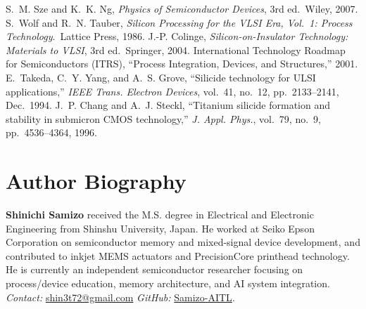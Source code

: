 \documentclass[conference]{IEEEtran}
\begin{document}
\begin{thebibliography}{99}
S.~M. Sze and K.~K. Ng, \emph{Physics of Semiconductor Devices}, 3rd ed.\ Wiley, 2007.
S.~Wolf and R.~N. Tauber, \emph{Silicon Processing for the VLSI Era, Vol.~1: Process Technology}.\ Lattice Press, 1986.
J.-P. Colinge, \emph{Silicon-on-Insulator Technology: Materials to VLSI}, 3rd ed.\ Springer, 2004.
International Technology Roadmap for Semiconductors (ITRS), ``Process Integration, Devices, and Structures,'' 2001.
E.~Takeda, C.~Y. Yang, and A.~S. Grove, ``Silicide technology for ULSI applications,'' \emph{IEEE Trans. Electron Devices}, vol.~41, no.~12, pp.~2133--2141, Dec.~1994.
J.~P. Chang and A.~J. Steckl, ``Titanium silicide formation and stability in submicron CMOS technology,'' \emph{J. Appl. Phys.}, vol.~79, no.~9, pp.~4536--4364, 1996.
\end{thebibliography}

\section*{Author Biography}
\textbf{Shinichi Samizo} received the M.S. degree in Electrical and Electronic Engineering from Shinshu University, Japan.
He worked at Seiko Epson Corporation on semiconductor memory and mixed-signal device development, and contributed to inkjet MEMS actuators and PrecisionCore printhead technology.
He is currently an independent semiconductor researcher focusing on process/device education, memory architecture, and AI system integration.\\
\emph{Contact:} \href{mailto:shin3t72@gmail.com}{shin3t72@gmail.com}\quad
\emph{GitHub:} \href{https://github.com/Samizo-AITL}{Samizo-AITL}.
\end{document}
